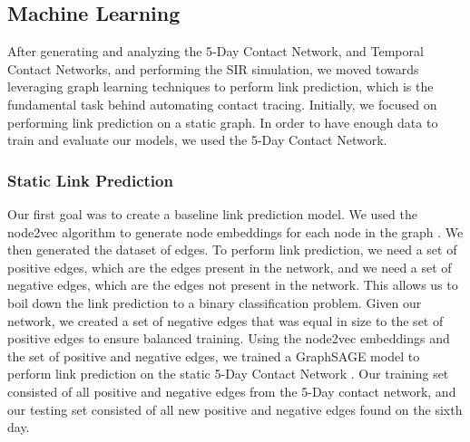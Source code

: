 \documentclass[times, 10pt,twocolumn]{article}
\begin{document}
\subsection{Machine Learning}



After generating and analyzing the 5-Day Contact Network, and Temporal Contact Networks, and performing the SIR simulation, we moved towards leveraging graph learning techniques to perform link prediction, which is the fundamental task behind automating contact tracing. Initially, we focused on performing link prediction on a static graph. In order to have enough data to train and evaluate our models, we used the 5-Day Contact Network. 

\subsubsection{Static Link Prediction}
Our first goal was to create a baseline link prediction model. We used the node2vec algorithm to generate node embeddings for each node in the graph \cite{grover2016node2vec}. We then generated the dataset of edges. To perform link prediction, we need a set of positive edges, which are the edges present in the network, and we need a set of negative edges, which are the edges not present in the network. This allows us to boil down the link prediction to a binary classification problem. Given our network, we created a set of negative edges that was equal in size to the set of positive edges to ensure balanced training. Using the node2vec embeddings and the set of positive and negative edges, we trained a GraphSAGE model to perform link prediction on the static 5-Day Contact Network \cite{hamilton2018inductive}. Our training set consisted of all positive and negative edges from the 5-Day contact network, and our testing set consisted of all new positive and negative edges found on the sixth day.
\end{document}
